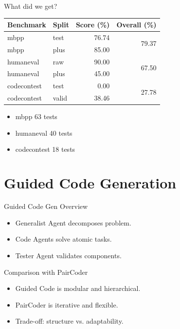 \documentclass{beamer}
\begin{document}
	\begin{frame}{What did we get?}
	  \begin{table}
	    \centering
	    \begin{tabular}{l l r r}
	      \toprule
	      \textbf{Benchmark} & \textbf{Split} & \textbf{Score (\%)} & \textbf{Overall (\%)} \\
	      \midrule
	      mbpp        & test  & 76.74 & \multirow{2}{*}{79.37} \\
	      mbpp        & plus  & 85.00 & \\
	      \midrule
	      humaneval   & raw   & 90.00 & \multirow{2}{*}{67.50} \\
	      humaneval   & plus  & 45.00 & \\
	      \midrule
	      codecontest & test  &  0.00 & \multirow{2}{*}{27.78} \\
	      codecontest & valid & 38.46 & \\
	      \bottomrule
	    \end{tabular}
	  \end{table}
	   \begin{itemize}
	    \item mbpp 63 tests
	    \item humaneval 40 tests
	    \item codecontest 18 tests
	  \end{itemize}
	\end{frame}



	
	\section{Guided Code Generation}
	\begin{frame}{Guided Code Gen Overview}
	  \begin{itemize}
	    \item Generalist Agent decomposes problem.
	    \item Code Agents solve atomic tasks.
	    \item Tester Agent validates components.
	  \end{itemize}
	\end{frame}
	
	\begin{frame}{Comparison with PairCoder}
	  \begin{itemize}
	    \item Guided Code is modular and hierarchical.
	    \item PairCoder is iterative and flexible.
	    \item Trade-off: structure vs. adaptability.
	  \end{itemize}
	\end{frame}
	
\end{document}
